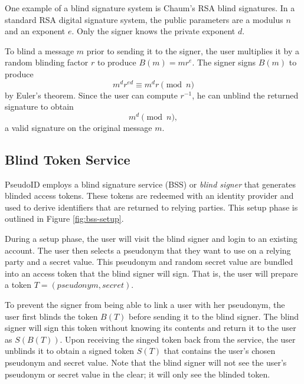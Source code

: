 \documentclass{llncs}
\begin{document}
One example of a blind signature system is Chaum's RSA blind signatures. In a
standard RSA digital signature system, the public parameters are a modulus $n$
and an exponent $e$. Only the signer knows the private exponent $d$.

To blind a message $m$ prior to sending it to the signer, the user
multiplies it by a random blinding factor $r$ to produce $B(m) =
mr^e$. The signer signs $B(m)$ to produce $$m^d r^{ed} \equiv m^d r
\pmod n$$ by Euler's theorem. Since the user can compute $r^{-1}$,
he can unblind the returned signature to obtain $$m^d \pmod n,$$ a
valid signature on the original message $m$.


\subsection{Blind Token Service}

PseudoID employs a blind signature service (BSS) or \emph{blind
  signer} that generates blinded access tokens. These tokens are
redeemed with an identity provider and used to derive identifiers that
are returned to relying parties. This setup phase is outlined in
Figure \ref{fig:bss-setup}.

During a setup phase, the user will visit the blind signer and login
to an existing account. The user then selects a pseudonym that they
want to use on a relying party and a secret value. This pseudonym and
random secret value are bundled into an access token that the blind
signer will sign. That is, the user will prepare a token $T =
(pseudonym, secret)$.

To prevent the signer from being able to link a user with her
pseudonym, the user first blinds the token $B(T)$ before sending it to
the blind signer. The blind signer will sign this token without
knowing its contents and return it to the user as $S(B(T))$. Upon
receiving the singed token back from the service, the user unblinds it
to obtain a signed token $S(T)$ that contains the user's chosen
pseudonym and secret value. Note that the blind signer will not see
the user's pseudonym or secret value in the clear; it will only see
the blinded token.
\end{document}

